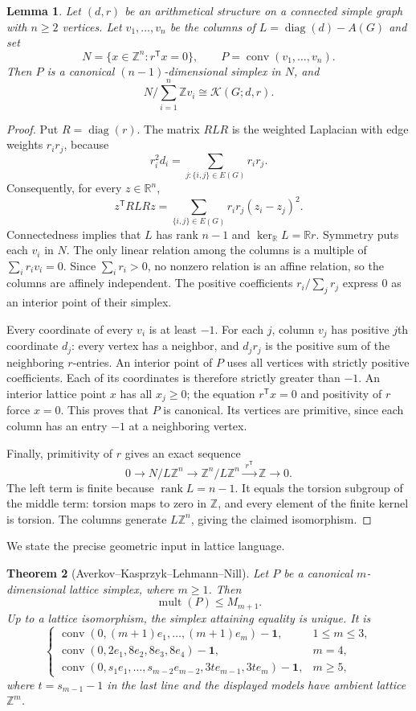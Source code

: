 \documentclass[11pt]{article}
\newtheorem{theorem}{Theorem}
\newtheorem{lemma}[theorem]{Lemma}
\theoremstyle{remark}
\DeclareMathOperator{\diag}{diag}
\DeclareMathOperator{\conv}{conv}
\newcommand{\Z}{\mathbb Z}
\newcommand{\R}{\mathbb R}
\newcommand{\K}{\mathcal K}
\newcommand{\one}{\mathbf 1}
\begin{document}
\begin{lemma}\label{lem:bridge}
Let $(d,r)$ be an arithmetical structure on a connected simple graph with $n\geq2$ vertices. Let $v_1,\ldots,v_n$ be the columns of $L=\diag(d)-A(G)$ and set
\[
 N=\{x\in\Z^n:r^{\mathsf T}x=0\},\qquad
 P=\conv(v_1,\ldots,v_n).
\]
Then $P$ is a canonical $(n-1)$-dimensional simplex in $N$, and
\[
 N/\sum_{i=1}^n\Z v_i\cong\K(G;d,r).
\]
\end{lemma}
\begin{proof}
Put $R=\diag(r)$. The matrix $RLR$ is the weighted Laplacian with edge weights $r_i r_j$, because
\[
 r_i^2d_i=\sum_{j:\{i,j\}\in E(G)}r_i r_j.
\]
Consequently, for every $z\in\R^n$,
\[
 z^{\mathsf T}RLRz
 =\sum_{\{i,j\}\in E(G)}r_i r_j(z_i-z_j)^2.
\]
Connectedness implies that $L$ has rank $n-1$ and $\ker_{\R}L=\R r$. Symmetry puts each $v_i$ in $N$. The only linear relation among the columns is a multiple of $\sum_i r_i v_i=0$. Since $\sum_i r_i>0$, no nonzero relation is an affine relation, so the columns are affinely independent. The positive coefficients $r_i/\sum_jr_j$ express $0$ as an interior point of their simplex.

Every coordinate of every $v_i$ is at least $-1$. For each $j$, column $v_j$ has positive $j$th coordinate $d_j$: every vertex has a neighbor, and $d_jr_j$ is the positive sum of the neighboring $r$-entries. An interior point of $P$ uses all vertices with strictly positive coefficients. Each of its coordinates is therefore strictly greater than $-1$. An interior lattice point $x$ has all $x_j\geq0$; the equation $r^{\mathsf T}x=0$ and positivity of $r$ force $x=0$. This proves that $P$ is canonical. Its vertices are primitive, since each column has an entry $-1$ at a neighboring vertex.

Finally, primitivity of $r$ gives an exact sequence
\[
 0\longrightarrow N/L\Z^n
 \longrightarrow\Z^n/L\Z^n
 \xrightarrow{\;r^{\mathsf T}\;}\Z
 \longrightarrow0.
\]
The left term is finite because $\operatorname{rank}L=n-1$. It equals the torsion subgroup of the middle term: torsion maps to zero in $\Z$, and every element of the finite kernel is torsion. The columns generate $L\Z^n$, giving the claimed isomorphism.
\end{proof}

We state the precise geometric input in lattice language.

\begin{theorem}[Averkov--Kasprzyk--Lehmann--Nill]\label{thm:AKLN}
Let $P$ be a canonical $m$-dimensional lattice simplex, where $m\geq1$. Then
\[
 \operatorname{mult}(P)\leq M_{m+1}.
\]
Up to a lattice isomorphism, the simplex attaining equality is unique. It is
\[
 \begin{cases}
 \conv(0,(m+1)e_1,\ldots,(m+1)e_m)-\one,&1\leq m\leq3,\\[2pt]
 \conv(0,2e_1,8e_2,8e_3,8e_4)-\one,&m=4,\\[2pt]
 \conv(0,s_1e_1,\ldots,s_{m-2}e_{m-2},3te_{m-1},3te_m)-\one,
 &m\geq5,
 \end{cases}
\]
where $t=s_{m-1}-1$ in the last line and the displayed models have ambient lattice $\Z^m$.
\end{theorem}
\end{document}
